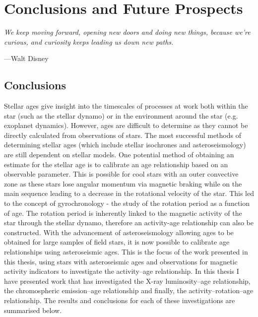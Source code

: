 
\chapter{Conclusions and Future Prospects} %

\label{Chapter6} %


\epigraph{\itshape We keep moving forward, opening new doors and doing new things, because we're curious, and curiosity keeps leading us down new paths.}{---Walt Disney}

\section{Conclusions}

Stellar ages give insight into the timescales of processes at work both within the star (such as the stellar dynamo) or in the environment around the star (e.g. exoplanet dynamics). However, ages are difficult to determine as they cannot be directly calculated from observations of stars. The most successful methods of determining stellar ages (which include stellar isochrones and asteroseismology) are still dependent on stellar models. One potential method of obtaining an estimate for the stellar age is to calibrate an age relationship based on an observable parameter. This is possible for cool stars with an outer convective zone as these stars lose angular momentum via magnetic braking while on the main sequence leading to a decrease in the rotational velocity of the star. This led to the concept of gyrochronology - the study of the rotation period as a function of age. The rotation period is inherently linked to the magnetic activity of the star through the stellar dynamo, therefore an activity-age relationship can also be constructed. With the advancement of asteroseismology allowing ages to be obtained for large samples of field stars, it is now possible to calibrate age relationships using asteroseismic ages. This is the focus of the work presented in this thesis, using stars with asteroseismic ages and observations for magnetic activity indicators to investigate the activity--age relationship. In this thesis I have presented work that has investigated the X-ray luminosity--age relationship, the chromospheric emission--age relationship and finally, the activity--rotation--age relationship. The results and conclusions for each of these investigations are summarised below.

